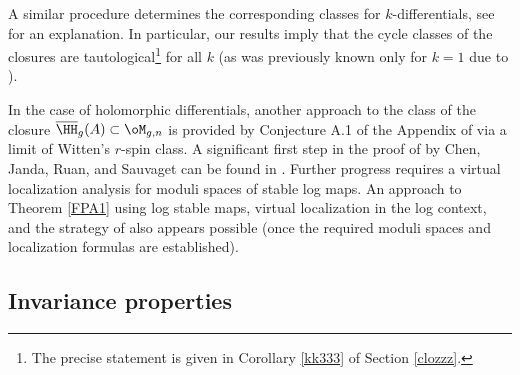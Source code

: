 A similar procedure determines the corresponding classes for $k$-differentials, see \cite[Section 3.4]{Schmitt2016Dimension-theor} for an explanation. In particular,
our results imply that the cycle classes of the closures
are tautological{\footnote{The precise statement is given in
Corollary \ref{kk333} of Section \ref{clozzz}.}}
for all $k$ (as was previously known only for $k=1$ due to \cite{Sauvaget2017Cohomology-clas}).

In the case of holomorphic differentials, another approach to the class of
the closure $\overline{\HH}_g(A) \subset \oM_{g,n}$ is provided
by Conjecture A.1 of the Appendix of \cite{Pandharipande2019Tautological-re} via a limit of
Witten's $r$-spin class. A significant first step in the proof of \cite[Conjecture A.1]{Pandharipande2019Tautological-re} by
Chen, Janda, Ruan, and Sauvaget can be found in \cite{Chen2018Towards-a-Theor}. Further progress
requires
a virtual localization analysis for moduli spaces of
stable log maps. An approach to
Theorem \ref{FPA1} using log stable maps, virtual localization in the log context, and
the strategy of \cite{Janda2016Double-ramifica} also appears possible (once the
required moduli spaces and localization formulas are established).



\subsection{Invariance properties} \label{Sect:introinvariance}

